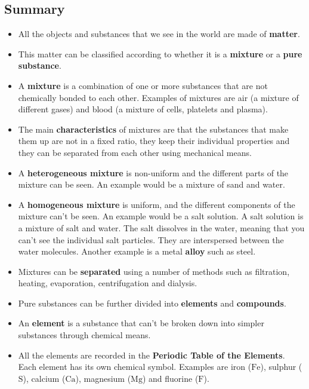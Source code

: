             \subsection{ Summary}
            \nopagebreak
      \label{m38706*id67458}\begin{itemize}[noitemsep]
            \label{m38706*uid114}\item All the objects and substances that we see in the world are made of \textbf{matter}.
\label{m38706*uid115}\item This matter can be classified according to whether it is a \textbf{mixture} or a \textbf{pure substance}.
\label{m38706*uid116}\item A \textbf{mixture} is a combination of one or more substances that are not chemically bonded to each other. Examples of mixtures are air (a mixture of different gases) and blood (a mixture of cells, platelets and plasma).
\label{m38706*uid117}\item The main \textbf{characteristics} of mixtures are that the substances that make them up are not in a fixed ratio, they keep their individual properties and they can be separated from each other using mechanical means.
\label{m38706*uid118}\item A \textbf{heterogeneous mixture} is non-uniform and the different parts of the mixture can be seen. An example would be a mixture of sand and water.
\label{m38706*uid119}\item A \textbf{homogeneous mixture} is uniform, and the different components of the mixture can't be seen. An example would be a salt solution. A salt solution is a mixture of salt and water. The salt dissolves in the water, meaning that you can't see the individual salt particles. They are interspersed between the water molecules. Another example is a metal \textbf{alloy} such as steel.
\label{m38706*uid120}\item Mixtures can be \textbf{separated} using a number of methods such as filtration, heating, evaporation, centrifugation and dialysis.
\label{m38706*uid121}\item Pure substances can be further divided into \textbf{elements} and \textbf{compounds}.
\label{m38706*uid122}\item An \textbf{element} is a substance that can't be broken down into simpler substances through chemical means.
\label{m38706*uid123}\item All the elements are recorded in the \textbf{Periodic Table of the Elements}. Each element has its own chemical symbol. Examples are iron ($\mathrm{Fe}$), sulphur ($\mathrm{S}$), calcium ($\mathrm{Ca}$), magnesium ($\mathrm{Mg}$) and fluorine ($\mathrm{F}$).

\end{itemize}
